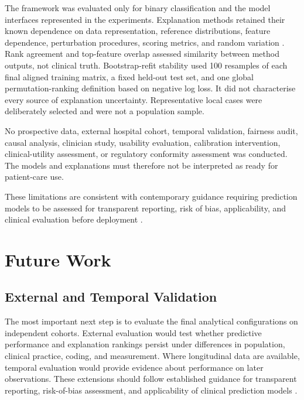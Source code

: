 The framework was evaluated only for binary classification and the model interfaces represented in the experiments. Explanation methods retained their known dependence on data representation, reference distributions, feature dependence, perturbation procedures, scoring metrics, and random variation
\citep{NIPS2017_8a20a862, ribeiro_why_2016,
vilone_classification_2021, lofstrom_meta_2022}. Rank agreement and top-feature overlap assessed similarity between method outputs, not clinical truth. Bootstrap-refit stability used 100 resamples of each final aligned training matrix, a fixed held-out test set, and one global permutation-ranking definition based on negative log loss. It did not characterise every source of explanation uncertainty. Representative local cases were deliberately selected and were not a population sample.

No prospective data, external hospital cohort, temporal validation, fairness audit, causal analysis, clinician study, usability evaluation, calibration intervention, clinical-utility assessment, or regulatory conformity assessment was conducted. The models and explanations must therefore not be interpreted as ready for patient-care use.

These limitations are consistent with contemporary guidance requiring prediction models to be assessed for transparent reporting, risk of bias, applicability, and clinical evaluation before deployment \citep{moons_probastai_2025, collins_tripodai_2024, vasey_decideai_2022}.

\section{Future Work}

\subsection{External and Temporal Validation}

The most important next step is to evaluate the final analytical configurations on independent cohorts. External evaluation would test whether predictive performance and explanation rankings persist under differences in population, clinical practice, coding, and measurement.
Where longitudinal data are available, temporal evaluation would provide evidence about performance on later observations. These extensions should follow established guidance for transparent reporting, risk-of-bias assessment, and applicability of clinical prediction models \citep{collins_tripodai_2024, moons_probastai_2025}.

